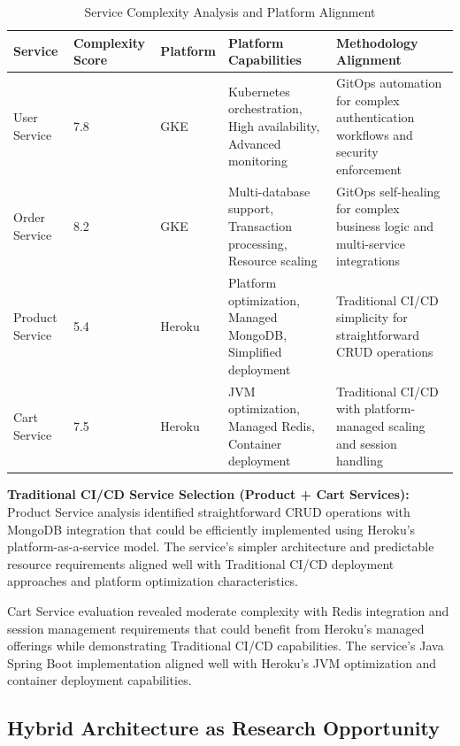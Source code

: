 \begin{table}[H]
\centering
\caption{Service Complexity Analysis and Platform Alignment}
\label{tab:service-complexity-analysis}
\renewcommand{\arraystretch}{1.2}
\footnotesize
\begin{tabular}{|p{2.2cm}|p{1.8cm}|p{1.5cm}|p{3.8cm}|p{4.2cm}|}
\hline
\textbf{Service} & \textbf{Complexity Score} & \textbf{Platform} & \textbf{Platform Capabilities} & \textbf{Methodology Alignment} \\
\hline
User Service & 7.8 & GKE & Kubernetes orchestration, High availability, Advanced monitoring & GitOps automation for complex authentication workflows and security enforcement \\
\hline
Order Service & 8.2 & GKE & Multi-database support, Transaction processing, Resource scaling & GitOps self-healing for complex business logic and multi-service integrations \\
\hline
Product Service & 5.4 & Heroku & Platform optimization, Managed MongoDB, Simplified deployment & Traditional CI/CD simplicity for straightforward CRUD operations \\
\hline
Cart Service & 7.5 & Heroku & JVM optimization, Managed Redis, Container deployment & Traditional CI/CD with platform-managed scaling and session handling \\
\hline
\end{tabular}
\end{table}

\textbf{Traditional CI/CD Service Selection (Product + Cart Services):}
Product Service analysis identified straightforward CRUD operations with MongoDB integration that could be efficiently implemented using Heroku's platform-as-a-service model. The service's simpler architecture and predictable resource requirements aligned well with Traditional CI/CD deployment approaches and platform optimization characteristics.

Cart Service evaluation revealed moderate complexity with Redis integration and session management requirements that could benefit from Heroku's managed offerings while demonstrating Traditional CI/CD capabilities. The service's Java Spring Boot implementation aligned well with Heroku's JVM optimization and container deployment capabilities.


\subsection{Hybrid Architecture as Research Opportunity}

